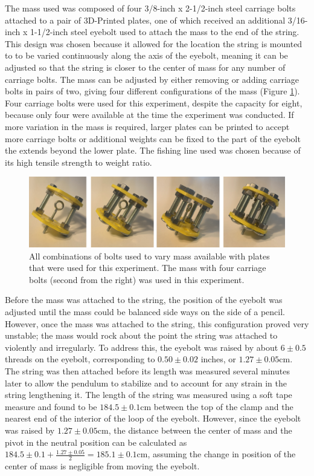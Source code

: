 \documentclass[11pt]{article}
\begin{document}
        The mass used was composed of four 3/8-inch x 2-1/2-inch steel carriage bolts attached to a pair of 3D-Printed plates, one of which received an additional 3/16-inch x 1-1/2-inch steel eyebolt used to attach the mass to the end of the string. This design was chosen because it allowed for the location the string is mounted to to be varied continuously along the axis of the eyebolt, meaning it can be adjusted so that the string is closer to the center of mass for any number of carriage bolts. The mass can be adjusted by either removing or adding carriage bolts in pairs of two, giving four different configurations of the mass (Figure \ref{fig:masses}). Four carriage bolts were used for this experiment, despite the capacity for eight, because only four were available at the time the experiment was conducted. If more variation in the mass is required, larger plates can be printed to accept more carriage bolts or additional weights can be fixed to the part of the eyebolt the extends beyond the lower plate. The fishing line used was chosen because of its high tensile strength to weight ratio. 

        \begin{figure}[H]
            \centering\includegraphics[width = 0.75\linewidth]{allMasses.PNG}
            \caption{All combinations of bolts used to vary mass available with plates that were used for this experiment. The mass with four carriage bolts (second from the right) was used in this experiment.}
            \label{fig:masses}
        \end{figure}

        Before the mass was attached to the string, the position of the eyebolt was adjusted until the mass could be balanced side ways on the side of a pencil. However, once the mass was attached to the string, this configuration proved very unstable; the mass would rock about the point the string was attached to violently and irregularly. To address this, the eyebolt was raised by about $6 \pm 0.5$ threads on the eyebolt, corresponding to $0.50 \pm 0.02$ inches, or $1.27 \pm 0.05$cm. The string was then attached before its length was measured several minutes later to allow the pendulum to stabilize and to account for any strain in the string lengthening it. The length of the string was measured using a soft tape measure and found to be $184.5 \pm 0.1$cm between the top of the clamp and the nearest end of the interior of the loop of the eyebolt. However, since the eyebolt was raised by $1.27 \pm 0.05$cm, the distance between the center of mass and the pivot in the neutral position can be calculated as $184.5 \pm 0.1 + \frac{1.27 \pm 0.05}{2} = 185.1 \pm 0.1$cm, assuming the change in position of the center of mass is negligible from moving the eyebolt.
\end{document}
